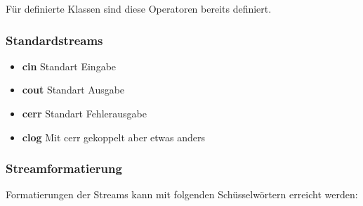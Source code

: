Für definierte Klassen sind diese Operatoren bereits definiert.

\subsubsection{Standardstreams}

\begin{itemize}[itemsep=1pt, parsep=0pt]
    \item \textbf{cin} Standart Eingabe
    \item \textbf{cout} Standart Ausgabe
    \item \textbf{cerr} Standart Fehlerausgabe
    \item \textbf{clog} Mit cerr gekoppelt aber etwas anders
\end{itemize}

\subsubsection{Streamformatierung}

Formatierungen der Streams kann mit folgenden Schüsselwörtern erreicht werden:


